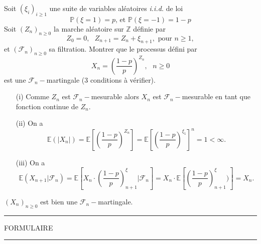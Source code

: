 \documentclass[11pt, addpoints, answers]{exam}
\begin{document}
\begin{questions}
\question[2] Soit $(\xi_i)_{i\geq 1}$ une suite de variables aléatoires \textit{i.i.d.} de loi 
$$
\mathbb{P}(\xi =1) = p\text{, et }\mathbb{P}(\xi =-1) = 1-p
$$
Soit $(Z_n)_{n\geq 0}$ la marche aléatoire sur $\mathbb{Z}$ définie par 
$$
Z_0 = 0,\text{ }Z_{n+1} = Z_n + \xi_{n+1},\text{ pour } n\geq 1,
$$
et $(\mathcal{F}_n)_{n\geq 0}$ sa filtration. Montrer que le processus défini par
$$
X_n = \left(\frac{1-p}{p}\right)^{Z_n},\text{ }n\geq 0
$$
est une $\mathcal{F}_n-$martingale (3 conditions à vérifier).
\begin{solution}
\begin{itemize}
	\item[(i)] Comme $Z_n$ est $\mathcal{F}_n-$mesurable alors $X_n$ est $\mathcal{F}_n-$mesurable en tant que fonction continue de $Z_n$.
	\item[(ii)] On a 
	$$
	\mathbb{E}(|X_n|) = \mathbb{E}\left[\left(\frac{1-p}{p}\right)^{Z_n}\right] = \mathbb{E}\left[\left(\frac{1-p}{p}\right)^{\xi_1}\right]^n = 1<\infty.
	$$   
	\item[(iii)] On a 
	$$
	\mathbb{E}(X_{n+1}|\mathcal{F}_n) = \mathbb{E}\left[X_{n} \cdot\left(\frac{1-p}{p}\right)^\xi_{n+1}|\mathcal{F}_n \right]  = X_n\cdot\mathbb{E}\left[\left(\frac{1-p}{p}\right)^\xi_{n+1})\right] = X_n.
	$$
\end{itemize}
$(X_n)_{n\geq0}$ est bien une $\mathcal{F}_n-$martingale.
\end{solution}
\end{questions}
\newpage
\hrule
\vspace*{.15in}
\begin{center}
  \large\MakeUppercase{Formulaire}
\end{center}
\vspace*{.15in}
\hrule
\vspace*{.25in}
\end{document}
